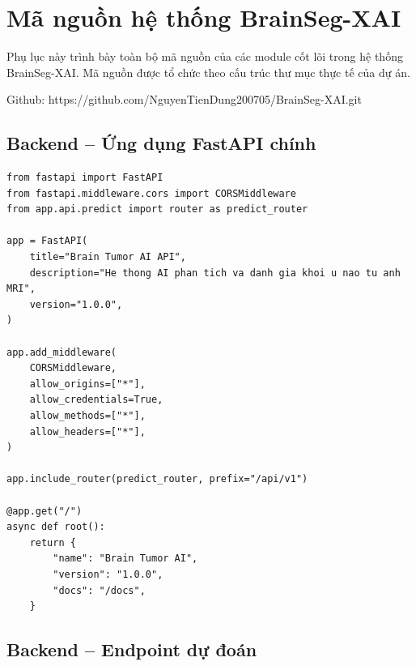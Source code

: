 
\chapter{Mã nguồn hệ thống BrainSeg-XAI}

\label{AppendixA}


Phụ lục này trình bày toàn bộ mã nguồn của các module cốt lõi trong hệ thống BrainSeg-XAI.
Mã nguồn được tổ chức theo cấu trúc thư mục thực tế của dự án.

Github: https://github.com/NguyenTienDung200705/BrainSeg-XAI.git

\section{Backend -- Ứng dụng FastAPI chính }

\begin{lstlisting}[style=codePython, caption={FastAPI -- Khoi tao app va CORS middleware (app/main.py)}]
from fastapi import FastAPI
from fastapi.middleware.cors import CORSMiddleware
from app.api.predict import router as predict_router

app = FastAPI(
    title="Brain Tumor AI API",
    description="He thong AI phan tich va danh gia khoi u nao tu anh MRI",
    version="1.0.0",
)

app.add_middleware(
    CORSMiddleware,
    allow_origins=["*"],
    allow_credentials=True,
    allow_methods=["*"],
    allow_headers=["*"],
)

app.include_router(predict_router, prefix="/api/v1")

@app.get("/")
async def root():
    return {
        "name": "Brain Tumor AI",
        "version": "1.0.0",
        "docs": "/docs",
    }
\end{lstlisting}

\section{Backend -- Endpoint dự đoán}

